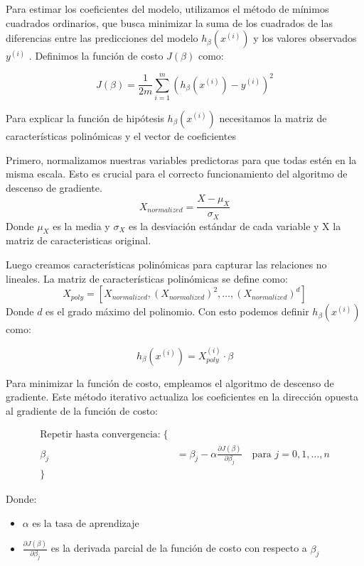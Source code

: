 \documentclass[11pt]{article}
\begin{document}
Para estimar los coeficientes del modelo, utilizamos el método de mínimos cuadrados ordinarios, que busca minimizar la suma de los cuadrados de las diferencias entre las predicciones del modelo $h_\beta(x^{(i)})$ y los valores observados $y^{(i)}$ . Definimos la función de costo $J(\beta)$ como:

\begin{equation}
J(\beta) = \frac{1}{2m} \sum\limits_{i = 1}^{m} (h_\beta(x^{(i)}) - y^{(i)})^2
\end{equation}

Para explicar la función de hipótesis $h_\beta(x^{(i)})$ necesitamos la matriz de características polinómicas y el vector de coeficientes

Primero, normalizamos nuestras variables predictoras para que todas estén en la misma escala. Esto es crucial para el correcto funcionamiento del algoritmo de descenso de gradiente.
\begin{equation}
X_{normalized} = \frac{X - \mu_X}{\sigma_X}
\end{equation}
Donde $\mu_X$ es la media y $\sigma_X$ es la desviación estándar de cada variable y X la matriz de caracteristicas original.

Luego creamos características polinómicas para capturar las relaciones no lineales. 
La matriz de características polinómicas se define como:
\begin{equation}
X_{poly} = [X_{normalized}, (X_{normalized})^2, \ldots, (X_{normalized})^d]
\end{equation}
Donde $d$ es el grado máximo del polinomio. Con esto podemos definir $h_\beta(x^{(i)})$ como:

\begin{equation}
h_\beta(x^{(i)}) = X_{poly}^{(i)} \cdot \beta
\end{equation}


Para minimizar la función de costo, empleamos el algoritmo de descenso de gradiente. Este método iterativo actualiza los coeficientes en la dirección opuesta al gradiente de la función de costo:

\begin{align*} 
\text{Repetir hasta convergencia:} \; \lbrace \\
\beta_j &= \beta_j - \alpha \frac{\partial J(\beta)}{\partial \beta_j} \quad \text{para } j = 0, 1, \ldots, n \\ 
\rbrace
\end{align*}

Donde:
\begin{itemize}
\item $\alpha$ es la tasa de aprendizaje
\item $\frac{\partial J(\beta)}{\partial \beta_j}$ es la derivada parcial de la función de costo con respecto a $\beta_j$
\end{itemize}
\end{document}
